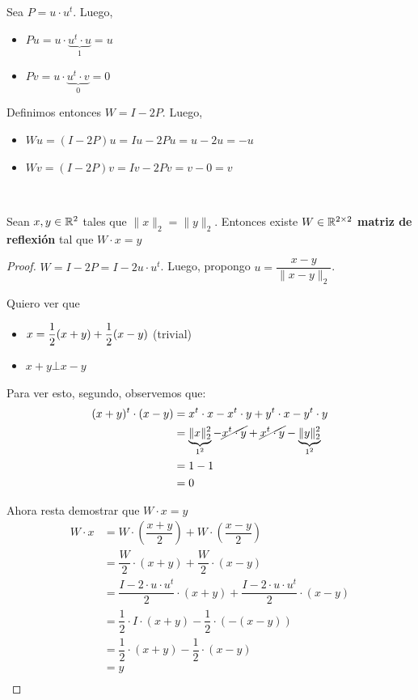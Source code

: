 \documentclass[]{article}
\begin{document}
Sea $P=u\cdot u^t$. Luego,
\begin{itemize}
	\item $P u = u\cdot \underbrace{u^t \cdot u}_{1} = u$
	\item $P v = u\cdot \underbrace{u^t\cdot v}_{0} = 0$
\end{itemize}

Definimos entonces $W=I-2 P$. Luego,
\begin{itemize}
	\item $Wu = (I-2 P) u = I u - 2 P u = u-2 u = -u$
	\item $W v = (I-2 P) v = I v - 2 P v = v-0 = v$
\end{itemize}

~\newline

\begin{prop}\label{existe_reflexion}
	Sean $x,y\in\mathbb{R}^2$ tales que $\|x\|_2 = \|y\|_2$. Entonces existe $W\in\mathbb{R}^{2\times2}$ \textbf{matriz de reflexión} tal que $W\cdot x=y$
	\begin{proof}
		$W = I-2P = I-2u\cdot u^t$. Luego, propongo $u = \dfrac{x-y}{\|x-y\|_2}$.

		Quiero ver que
		\begin{itemize}
			\item $x = \dfrac{1}{2}(x+y) + \dfrac{1}{2}(x-y) \hfill$ (trivial)
			\item $x+y \bot x-y$
		\end{itemize}

		Para ver esto, segundo, observemos que:
		\begin{align*}
			(x+y)^t\cdot (x-y) &= x^t\cdot x - x^t\cdot y + y^t\cdot x - y^t\cdot y\\
			&= \underbrace{\|x\|_2^2}_{1^2} - \cancel{x^t\cdot y} + \cancel{x^t\cdot y} - \underbrace{\|y\|_2^2}_{1^2}\\
			&= 1-1\\
			&= 0
		\end{align*}

		Ahora resta demostrar que $W\cdot x = y$
		\begin{align*}
			W\cdot x &= W\cdot(\dfrac{x+y}{2}) + W\cdot(\dfrac{x-y}{2})\\
			&= \dfrac{W}{2}\cdot(x+y) + \dfrac{W}{2}\cdot(x-y)\\
			&= \dfrac{I-2\cdot u\cdot u^t}{2}\cdot(x+y) + \dfrac{I-2\cdot u\cdot u^t}{2}\cdot(x-y)\\
			&= \dfrac{1}{2}\cdot I\cdot(x+y) - \dfrac{1}{2}\cdot(-(x-y))\\
			&= \dfrac{1}{2}\cdot(x+y) - \dfrac{1}{2}\cdot(x-y)\\
			&= y\\
		\end{align*}
	\end{proof}
\end{prop}
\end{document}
